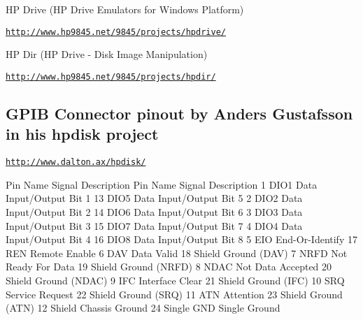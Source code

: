 \begin{DoxyItemize}
\item HP Drive (HP Drive Emulators for Windows Platform)
\begin{DoxyItemize}
\item \href{http://www.hp9845.net/9845/projects/hpdrive/}{\tt http\+://www.\+hp9845.\+net/9845/projects/hpdrive/}
\end{DoxyItemize}
\item HP Dir (HP Drive -\/ Disk Image Manipulation)
\begin{DoxyItemize}
\item \href{http://www.hp9845.net/9845/projects/hpdir/}{\tt http\+://www.\+hp9845.\+net/9845/projects/hpdir/} 


\end{DoxyItemize}
\end{DoxyItemize}

\subsection*{G\+P\+IB Connector pinout by Anders Gustafsson in his hpdisk project}


\begin{DoxyItemize}
\item \href{http://www.dalton.ax/hpdisk/}{\tt http\+://www.\+dalton.\+ax/hpdisk/}
\end{DoxyItemize}


\begin{DoxyPre}
    Pin Name   Signal Description       Pin Name   Signal Description 
    1   DIO1   Data Input/Output Bit 1  13  DIO5   Data Input/Output Bit 5 
    2   DIO2   Data Input/Output Bit 2  14  DIO6   Data Input/Output Bit 6 
    3   DIO3   Data Input/Output Bit 3  15  DIO7   Data Input/Output Bit 7 
    4   DIO4   Data Input/Output Bit 4  16  DIO8   Data Input/Output Bit 8 
    5   EIO    End-Or-Identify          17  REN    Remote Enable 
    6   DAV    Data Valid               18  Shield Ground (DAV) 
    7   NRFD   Not Ready For Data       19  Shield Ground (NRFD) 
    8   NDAC   Not Data Accepted        20  Shield Ground (NDAC) 
    9   IFC    Interface Clear          21  Shield Ground (IFC) 
    10  SRQ    Service Request          22  Shield Ground (SRQ) 
    11  ATN    Attention                23  Shield Ground (ATN) 
    12  Shield Chassis Ground           24  Single GND Single Ground
\end{DoxyPre}






